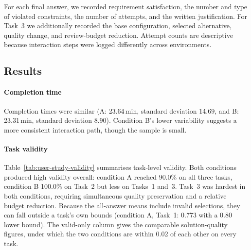 \documentclass[final,5p,times,twocolumn]{elsarticle}
\begin{document}
For each final answer, we recorded requirement satisfaction, the
number and type of violated constraints, the number of attempts, and the written justification. For Task~3 we additionally recorded the base
configuration, selected alternative, quality change, and review-budget
reduction. Attempt counts are descriptive because interaction steps
were logged differently across environments.

\subsection{Results}
\label{subsec:user-study-results}

\paragraph{Completion time}
Completion times were similar (A: 23.64\,min, standard deviation 14.69, and B: 23.31\,min, standard deviation 8.90). Condition B's lower variability
suggests a more consistent interaction path, though the sample is small.

\paragraph{Task validity}
Table~\ref{tab:user-study-validity} summarises task-level validity.
Both conditions produced high validity overall: condition A reached
90.0\% on all three tasks, condition B 100.0\% on Task~2 but less on
Tasks~1 and~3. Task~3 was hardest in both conditions, requiring
simultaneous quality preservation and a relative budget reduction. Because the all-answer means include invalid selections,
they can fall outside a task's own bounds (condition A, Task~1: 0.773
with a 0.80 lower bound). The valid-only column gives the comparable
solution-quality figures, under which the two conditions are within
0.02 of each other on every task.
\end{document}
